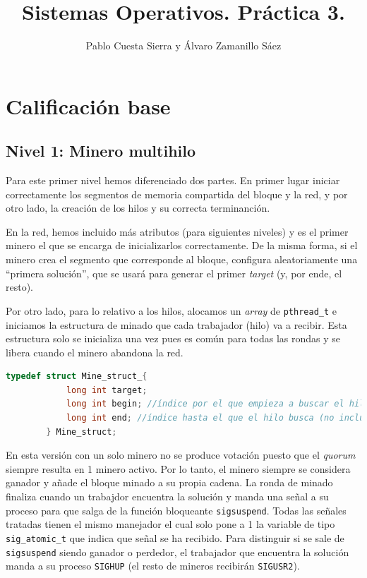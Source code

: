 \documentclass{article}
\begin{document}
\title{Sistemas Operativos. Práctica 3.}
\author{Pablo Cuesta Sierra y Álvaro Zamanillo Sáez}
\date{}
\maketitle

\begin{tcolorbox}
\tableofcontents
\end{tcolorbox}

\pagebreak

\section*{Calificación base}

\subsection*{Nivel 1: Minero multihilo}

    Para este primer nivel hemos diferenciado dos partes. En primer lugar iniciar correctamente los segmentos de memoria compartida del bloque y la red, y por otro lado, la creación de los hilos y su correcta terminanción. 

    En la red, hemos incluido más atributos (para siguientes niveles) y es el primer minero el que se encarga de inicializarlos correctamente.
    De la misma forma, si el minero crea el segmento que corresponde al bloque, configura aleatoriamente una ``primera solución'', que se usará para generar el primer \textit{target} (y, por ende, el resto).

    Por otro lado, para lo relativo a los hilos, alocamos un \textit{array} de \texttt{pthread\_t} e iniciamos la estructura de minado que cada trabajador (hilo) va a recibir. Esta estructura solo se inicializa una vez pues es común para todas las rondas y se libera cuando el minero abandona la red. 
    
    \begin{lstlisting}[language=C, texcl=true]
        typedef struct Mine_struct_{
            long int target;
            long int begin; //índice por el que empieza a buscar el hilo
            long int end; //índice hasta el que el hilo busca (no incluido)
        } Mine_struct;  \end{lstlisting}


    En esta versión con un solo minero no se produce votación puesto que el \textit{quorum} siempre resulta en 1 minero activo. Por lo tanto, el minero siempre se considera ganador y añade el bloque minado a su propia cadena. La ronda de minado finaliza cuando un trabajdor encuentra la solución y manda una señal a su proceso para que salga de la función bloqueante \texttt{sigsuspend}. Todas las señales tratadas tienen el mismo manejador el cual solo pone a 1 la variable de tipo \texttt{sig\_atomic\_t} que indica que señal se ha recibido. Para distinguir si se sale de \texttt{sigsuspend} siendo ganador o perdedor, el trabajador que encuentra la solución manda a su proceso \texttt{SIGHUP} (el resto de mineros recibirán \texttt{SIGUSR2}).
\end{document}
